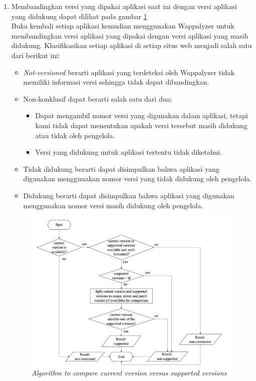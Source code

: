 \begin{enumerate}
	\item Membandingkan versi yang dipakai aplikasi saat ini dengan versi aplikasi yang didukung dapat dilihat pada gambar \ref{fig:apr}\\
	Buka kembali setiap aplikasi kemudian menggunakan Wappalyzer untuk membandingkan versi aplikasi yang dipakai dengan versi aplikasi yang masih didukung. Klasifikasikan setiap aplikasi di setiap situs web menjadi salah satu dari berikut ini:
	\begin{itemize}
		\item \textit{Not-versioned} berarti aplikasi yang terdeteksi oleh Wappalyzer tidak memiliki informasi versi sehingga tidak dapat dibandingkan.
		\item Non-konklusif dapat berarti salah satu dari dua:
		\begin{itemize}
			\item Dapat mengambil nomor versi yang digunakan dalam aplikasi, tetapi kami tidak dapat menentukan apakah versi tersebut masih didukung atau tidak oleh pengelola.
			\item Versi yang didukung untuk aplikasi tertentu tidak diketahui.
		\end{itemize}
		\item Tidak didukung berarti dapat disimpulkan bahwa aplikasi yang digunakan menggunakan nomor versi yang tidak didukung oleh pengelola.
		\item Didukung berarti dapat disimpulkan bahwa aplikasi yang digunakan menggunakan nomor versi masih didukung oleh pengelola.
	\end{itemize}
	\begin{figure}[H]
		\centering  
		\includegraphics[scale=0.9]{Gambar/compare_version.PNG}  
		\caption{\textit{ Algorithm to compare current version versus supported versions}} 
		\label{fig:apr} 
	\end{figure}
\end{enumerate}


